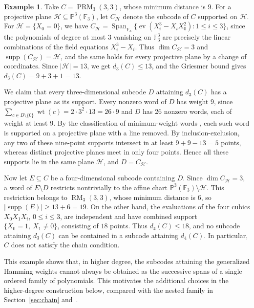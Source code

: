 \documentclass[11pt]{amsart}
\theoremstyle{definition}
\newtheorem{example}[theorem]{Example}
\newcommand{\F}{\mathbb F}
\newcommand{\PP}{\mathbb P}
\newcommand{\ev}{\operatorname{ev}}
\newcommand{\PRM}{\operatorname{PRM}}
\newcommand{\RM}{\operatorname{RM}}
\newcommand{\Span}{\operatorname{Span}}
\newcommand{\supp}{\operatorname{supp}}
\newcommand{\card}[1]{\left|#1\right|}
\numberwithin{equation}{section}
\begin{document}
\begin{example}\label{ex:failurechain}
Take $C=\PRM_3(3,3)$, whose minimum distance is $9$.
For a projective plane $\mathcal H\subseteq\PP^3(\F_3)$, let $C_{\mathcal H}$
denote the subcode of $C$ supported on $\mathcal H$.
For $\mathcal H=\{X_0=0\}$, we have
$C_{\mathcal H}=\Span_{\F_3}\{\ev(X_i^3-X_iX_0^2):1\le i\le3\}$, since
the polynomials of degree at most $3$ vanishing on $\F_3^3$ are precisely
the linear combinations of the field equations $X_i^3-X_i$.
Thus $\dim C_{\mathcal H}=3$ and $\supp(C_{\mathcal H})=\mathcal H$, and
the same holds for every projective plane by a change of coordinates.
Since $\card{\mathcal H}=13$, we get $d_3(C)\leq 13$, and the Griesmer bound gives $d_3(C)=9+3+1=13$.

We claim that every three-dimensional subcode $D$ attaining $d_3(C)$
has a projective plane as its support. Every nonzero word of $D$ has
weight $9$, since
$\sum_{c\in D\setminus\{0\}}\operatorname{wt}(c)=2\cdot3^2\cdot13=26\cdot9$ and $D$ has 26 nonzero words, each of weight at least 9.
By the classification of minimum-weight words \cite[Thm.~4.3]{GL24},
each such word is supported on a projective plane with a line removed.
By inclusion-exclusion, any two of these nine-point supports intersect in at least $9+9-13=5$ 
points, whereas distinct projective planes meet in only four points.
Hence all these supports lie in the same plane $\mathcal H$, and
$D=C_{\mathcal H}$.

Now let $E\subseteq C$ be a four-dimensional subcode containing $D$.
Since $\dim C_{\mathcal H}=3$, a word of $E\setminus D$ restricts
nontrivially to the affine chart $\PP^3(\F_3)\setminus\mathcal H$. This
restriction belongs to $\RM_3(3,3)$, whose minimum distance is $6$, so
$\card{\supp(E)}\ge13+6=19$. On the other hand, the evaluations of the
four cubics $X_0X_1X_i$, $0\le i\le3$, are independent and have combined
support $\{X_0=1,\ X_1\ne0\}$, consisting of $18$ points.
Thus $d_4(C)\le18$, and no subcode attaining $d_3(C)$ can be
contained in a subcode attaining $d_4(C)$.
In particular, $C$ does not satisfy the chain condition.
\end{example}

This example shows that, in higher degree, the subcodes attaining
the generalized Hamming weights cannot always be obtained as
the successive spans of a single ordered family of polynomials.
This motivates the additional choices in the higher-degree construction
below, compared with the nested family in Section~\ref{sec:chain}
and~\cite[Conj.~2.4]{BDG22}.
\end{document}
